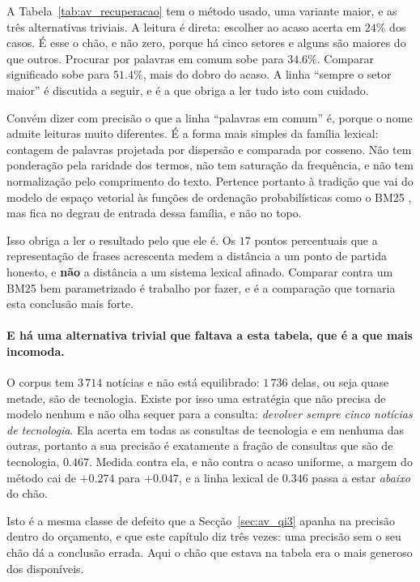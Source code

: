 A Tabela~\ref{tab:av_recuperacao} tem o método usado, uma variante maior, e as três alternativas
triviais. A leitura é direta: escolher ao acaso acerta em $24\%$ dos casos. É esse o chão, e não
zero, porque há cinco setores e alguns são maiores do que outros. Procurar por palavras em comum sobe para
$34.6\%$. Comparar significado sobe para $51.4\%$, mais do dobro do acaso. A linha
``sempre o setor maior'' é discutida a seguir, e é a que obriga a ler tudo isto com cuidado.

Convém dizer com precisão o que a linha ``palavras em comum'' é, porque o nome admite leituras muito
diferentes. É a forma mais simples da família lexical: contagem de palavras projetada por
dispersão e comparada por cosseno. Não tem ponderação pela raridade dos termos, não tem saturação da
frequência, e não tem normalização pelo comprimento do texto. Pertence portanto à tradição que vai do
modelo de espaço vetorial \autocite{salton1975vsm} às funções de ordenação probabilísticas como o
BM25 \autocite{robertson2009bm25}, mas fica no degrau de entrada dessa família, e não no topo.

Isso obriga a ler o resultado pelo que ele é. Os $17$ pontos percentuais que a representação de
frases \autocite{reimers2019sbert} acrescenta medem a distância a um ponto de partida honesto, e
\textbf{não} a distância a um sistema lexical afinado. Comparar contra um BM25 bem parametrizado é
trabalho por fazer, e é a comparação que tornaria esta conclusão mais forte.

\paragraph{E há uma alternativa trivial que faltava a esta tabela, que é a que mais incomoda.}
O corpus tem $3\,714$ notícias e não está equilibrado: $1\,736$ delas, ou seja quase metade, são de
tecnologia. Existe por isso uma estratégia que não precisa de modelo nenhum e não olha sequer para
a consulta: \emph{devolver sempre cinco notícias de tecnologia}. Ela acerta em todas as consultas
de tecnologia e em nenhuma das outras, portanto a sua precisão é exatamente a fração de consultas
que são de tecnologia, $0.467$. Medida contra ela, e não contra o acaso uniforme, a margem do
método cai de $+0.274$ para \textbf{$+0.047$}, e a linha lexical de $0.346$ passa a estar
\emph{abaixo} do chão.

Isto é a mesma classe de defeito que a Secção~\ref{sec:av_qi3} apanha na precisão dentro do
orçamento, e que este capítulo diz três vezes: uma precisão sem o seu chão dá a conclusão errada.
Aqui o chão que estava na tabela era o mais generoso dos disponíveis.

